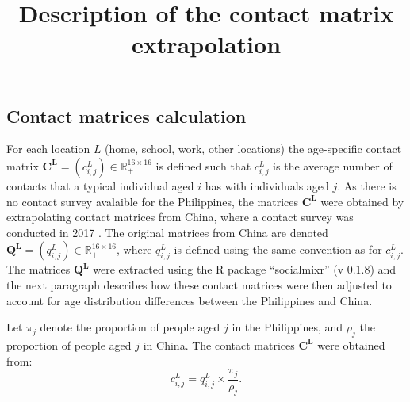 \documentclass[11pt]{article}
\title{Description of the contact matrix extrapolation}
\begin{document}
\maketitle

\newcommand{\myCountry}{the Philippines}
\newcommand{\myProxyCountry}{China}
\newcommand{\myProxyCountryDate}{2017}
\newcommand{\myProxyCountryReference}{\cite{RN10}}


\subsection{Contact matrices calculation}
For each location $L$ (home, school, work, other locations) the age-specific contact matrix $\mathbf{C^L} = (c_{i,j}^L) \in \mathbb{R}_{+}^{16 \times 16}$ is defined such that $c_{i,j}^L$ is the average number of contacts that a typical individual aged $i$ has with individuals aged $j$. As there is no contact survey avalaible for \myCountry{}, the matrices $\mathbf{C^L}$ were obtained by extrapolating contact matrices from \myProxyCountry{}, where a contact survey was conducted in \myProxyCountryDate{} \myProxyCountryReference{}. The original matrices from \myProxyCountry{} are denoted $\mathbf{Q^L} = (q_{i,j}^L) \in \mathbb{R}_{+}^{16 \times 16}$, where $q_{i,j}^L$ is defined using the same convention as for $c_{i,j}^L$. The matrices $\mathbf{Q^L}$ were extracted using the R package ``socialmixr'' (v 0.1.8) and the next paragraph describes how these contact matrices were then adjusted to account for age distribution differences between \myCountry{} and \myProxyCountry{}.


Let $\pi_j$ denote the proportion of people aged $j$ in \myCountry{}, and $\rho_j$ the proportion of people aged $j$ in \myProxyCountry{}. The contact matrices $\mathbf{C^L}$ were obtained from:
$$
c_{i,j}^L = q_{i,j}^L \times \frac{\pi_j}{\rho_j} . 
$$
\end{document}
